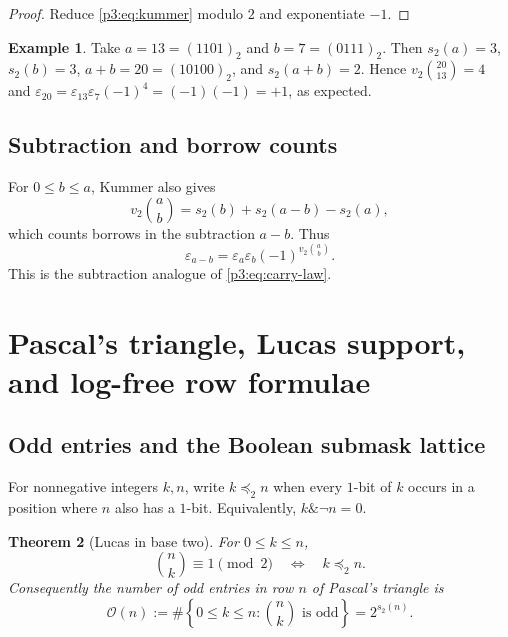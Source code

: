 \documentclass[11pt,oneside]{article}
\newtheorem{theorem}{Theorem}[section]
\theoremstyle{definition}
\newtheorem{example}[theorem]{Example}
\theoremstyle{remark}
\newcommand{\vtwo}{v_2}
\newcommand{\bitsum}{s_2}
\newcommand{\eps}{\varepsilon}
\newcommand{\submask}{\preccurlyeq_2}
\begin{document}
\begin{proof}
Reduce \cref{p3:eq:kummer} modulo $2$ and exponentiate $-1$.
\end{proof}

\begin{example}
Take $a=13=(1101)_2$ and $b=7=(0111)_2$.  Then
$\bitsum(a)=3$, $\bitsum(b)=3$, $a+b=20=(10100)_2$, and
$\bitsum(a+b)=2$.  Hence $\vtwo\binom{20}{13}=4$ and
$\eps_{20}=\eps_{13}\eps_7(-1)^4=( -1)(-1)=+1$, as expected.
\end{example}

\subsection{Subtraction and borrow counts}

For $0\le b\le a$, Kummer also gives
\begin{equation}\label{p3:eq:borrow-law}
 \vtwo\binom ab=\bitsum(b)+\bitsum(a-b)-\bitsum(a),
\end{equation}
which counts borrows in the subtraction $a-b$.  Thus
\begin{equation}\label{p3:eq:subtraction-thue-morse}
 \eps_{a-b}=\eps_a\eps_b(-1)^{\vtwo\binom ab}.
\end{equation}
This is the subtraction analogue of \cref{p3:eq:carry-law}.

\section{Pascal's triangle, Lucas support, and log-free row formulae}

\subsection{Odd entries and the Boolean submask lattice}

For nonnegative integers $k,n$, write $k\submask n$ when every $1$-bit of
$k$ occurs in a position where $n$ also has a $1$-bit.  Equivalently,
$k\mathbin{\&}\neg n=0$.

\begin{theorem}[Lucas in base two]\label{p3:thm:lucas}
For $0\le k\le n$,
\begin{equation}\label{p3:eq:lucas-submask}
 \binom nk\equiv1\pmod2
 \quad\Longleftrightarrow\quad
 k\submask n.
\end{equation}
Consequently the number of odd entries in row $n$ of Pascal's triangle is
\begin{equation}\label{p3:eq:glaisher}
 \mathcal O(n):=\#\left\{0\le k\le n:\binom nk\text{ is odd}\right\}
 =2^{\bitsum(n)}.
\end{equation}
\end{theorem}
\end{document}
